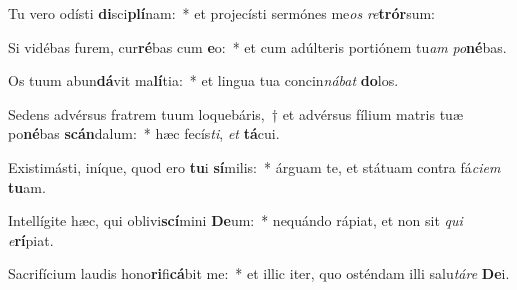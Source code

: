 \item Tu vero odísti \textbf{di}sci\textbf{plí}nam:~* et projecísti sermónes me\textit{os} \textit{re}\textbf{trór}sum:
\item Si vidébas furem, cur\textbf{ré}bas cum \textbf{e}o:~* et cum adúlteris portiónem tu\textit{am} \textit{po}\textbf{né}bas.
\item Os tuum abun\textbf{dá}vit ma\textbf{lí}tia:~* et lingua tua concin\textit{ná}\textit{bat} \textbf{do}los.
\item Sedens advérsus fratrem tuum loquebáris,~† et advérsus fílium matris tuæ po\textbf{né}bas \textbf{scán}dalum:~* hæc fecís\textit{ti}, \textit{et} \textbf{tá}cui.
\item Existimásti, iníque, quod ero \textbf{tu}i \textbf{sí}milis:~* árguam te, et státuam contra fá\textit{ci}\textit{em} \textbf{tu}am.
\item Intellígite hæc, qui oblivi\textbf{scí}mini \textbf{De}um:~* nequándo rápiat, et non sit \textit{qui} \textit{e}\textbf{rí}piat.
\item Sacrifícium laudis hono\textbf{ri}fi\textbf{cá}bit me:~* et illic iter, quo osténdam illi salu\textit{tá}\textit{re} \textbf{De}i.
